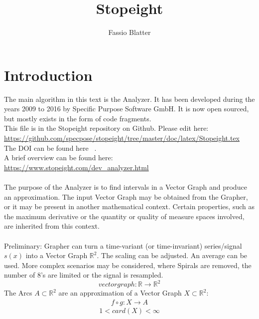 \documentclass{report}
\begin{document}
\title{Stopeight}
\author{Fassio Blatter}
\maketitle

\chapter{Introduction}
The main algorithm in this text is the Analyzer. It has been developed during the years 2009 to 2016 by Specific Purpose Software GmbH. It is now open sourced, but mostly exists in the form of code fragments.\\
This file is in the Stopeight repository on Github. Please edit here:\\
\href{https://github.com/specpose/stopeight/tree/master/doc/latex/Stopeight.tex}{https://github.com/specpose/stopeight/tree/master/doc/latex/Stopeight.tex}\\
The DOI can be found here ~\cite{Stopeight}.\\
A brief overview can be found here:\\
\href{https://www.stopeight.com/dev_analyzer.html}{https://www.stopeight.com/dev\_analyzer.html}\\\\
The purpose of the Analyzer is to find intervals in a Vector Graph and produce an approximation. The input Vector Graph may be obtained from the Grapher, or it may be present in another mathematical context. Certain properties, such as the maximum derivative or the quantity or quality of measure spaces involved, are inherited from this context.\\\\
Preliminary: Grapher can turn a time-variant (or time-invariant) series/signal $s(x)$ into a Vector Graph $\mathbb{R}^2$. The scaling can be adjusted. An average can be used. More complex scenarios may be considered, where Spirals are removed, the number of 8's are limited or the signal is resampled.
\begin{equation}
vectorgraph: \mathbb{R} \rightarrow \mathbb{R}^2
\end{equation}
The Arcs $A \subset \mathbb{R}^2$ are an approximation of a Vector Graph $X \subset \mathbb{R}^2$:
\begin{align}
f \circ g: X \rightarrow A
\end{align}
\begin{equation*}
1 < card(X) < \infty
\end{equation*}
\end{document}
